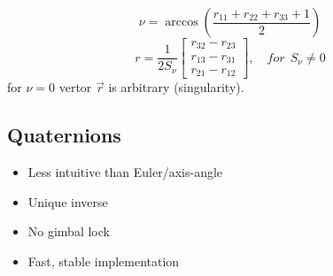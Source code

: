 \documentclass{article}
\begin{document}
$$ \nu = \arccos \left(
\frac{r_{11}+r_{22}+r_{33}+1}{2}  
\right)
$$
$$ r = \frac{1}{2S_{\nu}}
\begin{bmatrix}
r_{32}-r_{23}\\
r_{13}-r_{31}\\
r_{21}-r_{12}
\end{bmatrix}
, \quad for \:\: S_{\nu}\ne0
$$
for $ \nu = 0$ vertor $\vec{r}{}$ is arbitrary (singularity).

\newpage
\subsection{Quaternions}

\begin{itemize}
    \item Less intuitive than Euler/axis-angle
    \item Unique inverse
    \item No gimbal lock
    \item Fast, stable implementation
\end{itemize}
\end{document}
